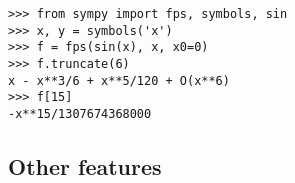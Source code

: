 \begin{verbatim}
>>> from sympy import fps, symbols, sin
>>> x, y = symbols('x')
>>> f = fps(sin(x), x, x0=0)
>>> f.truncate(6)
x - x**3/6 + x**5/120 + O(x**6)
>>> f[15]
-x**15/1307674368000
\end{verbatim}


\subsection{Other features}
